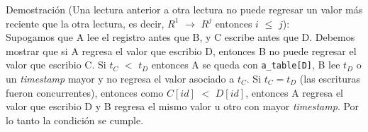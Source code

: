 \documentclass{article}
\begin{document}
\begin{enumerate}
{    Demostración (Una lectura anterior a otra lectura no puede regresar un
    valor más reciente que la otra lectura, es decir, $R^1$
    $\rightarrow$ $R^j$ entonces $i$ $\leq$ $j$):\\
    Supogamos que A lee el registro antes que B, y C escribe antes que
    D. Debemos mostrar que si A regresa el valor que escribio D,
    entonces B no puede regresar el valor que escribio C. Si $t_C$ $<$
    $t_D$ entonces A se queda con \texttt{a\_table[D]}, B lee $t_D$ o
    un \textit{timestamp} mayor y no regresa el valor asociado a
    $t_C$. Si $t_C = t_D$ (las escrituras fueron concurrentes),
    entonces como $C[id]$ $<$ $D[id]$, entonces A regresa el valor que
    escribio D y B regresa el mismo valor u otro con mayor
    \textit{timestamp}. Por lo tanto la condición se cumple.\\
  }
  
\end{enumerate}
\end{document}
